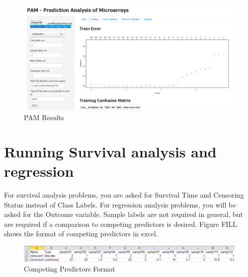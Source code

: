 \documentclass[12pt]{article}
\begin{document}
\begin{figure}
  \begin{center}
    \includegraphics[width=1\textwidth]{pam3.png}    
    \caption{PAM Results}
    \label{fig:pam-results}
  \end{center}
\end{figure}

\newpage
\section{Running Survival analysis and regression}

For survival analysis problems, you are asked for Survival Time and Censoring Status instead
of Class Labels. For regression analysis problems, you will be asked for the Outcome variable.
Sample labels are not required in general, but are required if a comparison to competing predictors
is desired. Figure FILL shows the format of competing predictors in excel.

\begin{figure}[htbp]
	\begin{center}
		\includegraphics[width=1\textwidth]{pam4.png}    
		\caption{Competing Predictors Format}
		\label{fig:pam-parameters}
	\end{center}
\end{figure}
\end{document}
